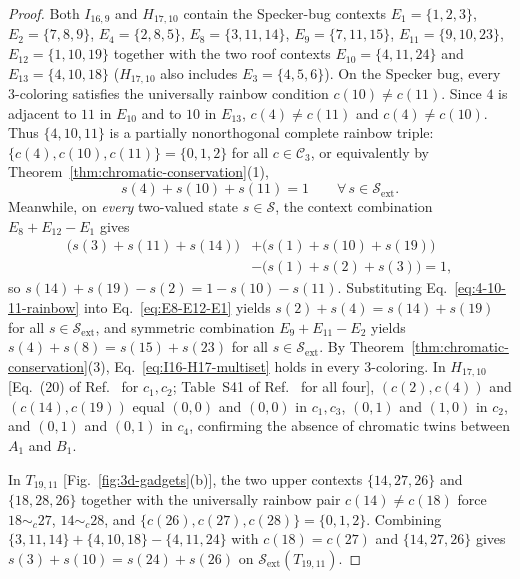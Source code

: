 \documentclass[aps,pra,reprint,superscriptaddress,longbibliography,nofootinbib,floatfix,10pt]{revtex4-2}
\theoremstyle{definition}\newtheorem{definition}[theorem]{Definition}
\theoremstyle{remark}\newtheorem{remark}[theorem]{Remark}
\newcommand{\Sc}{\mathcal S}\newcommand{\Cc}{\mathcal C}\newcommand{\Wc}{\mathcal W}
\begin{document}
\begin{proof}
Both $I_{16,9}$ and $H_{17,10}$ contain the Specker-bug contexts $E_1=\{1,2,3\}$, $E_2=\{7,8,9\}$, $E_4=\{2,8,5\}$, $E_8=\{3,11,14\}$, $E_9=\{7,11,15\}$, $E_{11}=\{9,10,23\}$, $E_{12}=\{1,10,19\}$ together with the two roof contexts $E_{10}=\{4,11,24\}$ and $E_{13}=\{4,10,18\}$ ($H_{17,10}$ also includes $E_3=\{4,5,6\}$). On the Specker bug, every $3$-coloring satisfies the universally rainbow condition $c(10)\neq c(11)$. Since $4$ is adjacent to $11$ in $E_{10}$ and to $10$ in $E_{13}$, $c(4)\neq c(11)$ and $c(4)\neq c(10)$. Thus $\{4,10,11\}$ is a partially nonorthogonal complete rainbow triple: $\{c(4),c(10),c(11)\}=\{0,1,2\}$ for all $c\in\Cc_3$, or equivalently by Theorem~\ref{thm:chromatic-conservation}(1),
\begin{equation}\label{eq:4-10-11-rainbow}
s(4)+s(10)+s(11)=1 \qquad \forall\, s\in\Sc_{\mathrm{ext}}.
\end{equation}
Meanwhile, on \emph{every} two-valued state $s\in\Sc$, the context combination $E_8+E_{12}-E_1$ gives
\begin{equation}\label{eq:E8-E12-E1}
\begin{aligned}
\bigl(s(3)+s(11)+s(14)\bigr)&+\bigl(s(1)+s(10)+s(19)\bigr)\\
&-\bigl(s(1)+s(2)+s(3)\bigr)=1,
\end{aligned}
\end{equation}
so $s(14)+s(19)-s(2)=1-s(10)-s(11)$. Substituting Eq.~\eqref{eq:4-10-11-rainbow} into Eq.~\eqref{eq:E8-E12-E1} yields $s(2)+s(4)=s(14)+s(19)$ for all $s\in\Sc_{\mathrm{ext}}$, and symmetric combination $E_9+E_{11}-E_2$ yields $s(4)+s(8)=s(15)+s(23)$ for all $s\in\Sc_{\mathrm{ext}}$. By Theorem~\ref{thm:chromatic-conservation}(3), Eq.~\eqref{eq:I16-H17-multiset} holds in every $3$-coloring. In $H_{17,10}$ [Eq.~(20) of Ref.~\cite{2026-latin-context-matrix} for $c_1,c_2$; Table~S41 of Ref.~\cite{supplement} for all four], $(c(2),c(4))$ and $(c(14),c(19))$ equal $(0,0)$ and $(0,0)$ in $c_1,c_3$, $(0,1)$ and $(1,0)$ in $c_2$, and $(0,1)$ and $(0,1)$ in $c_4$, confirming the absence of chromatic twins between $A_1$ and $B_1$.

In $T_{19,11}$ [Fig.~\ref{fig:3d-gadgets}(b)], the two upper contexts $\{14,27,26\}$ and $\{18,28,26\}$ together with the universally rainbow pair $c(14)\neq c(18)$ force $18\sim_c 27$, $14\sim_c 28$, and $\{c(26),c(27),c(28)\}=\{0,1,2\}$. Combining $\{3,11,14\}+\{4,10,18\}-\{4,11,24\}$ with $c(18)=c(27)$ and $\{14,27,26\}$ gives $s(3)+s(10)=s(24)+s(26)$ on $\Sc_{\mathrm{ext}}(T_{19,11})$.
\end{proof}
\end{document}
